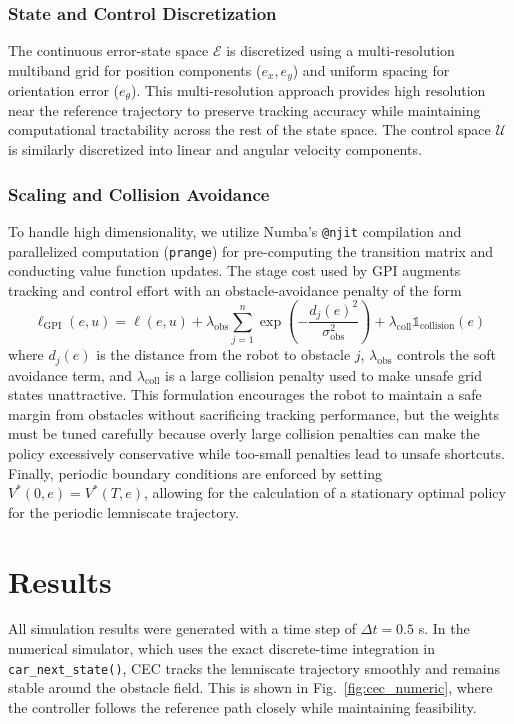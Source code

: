 \documentclass[conference]{IEEEtran}
\begin{document}
\subsubsection{State and Control Discretization}
The continuous error-state space $\mathcal{E}$ is discretized using a multi-resolution multiband grid for position components ($e_x, e_y$) and uniform spacing for orientation error ($e_\theta$). This multi-resolution approach provides high resolution near the reference trajectory to preserve tracking accuracy while maintaining computational tractability across the rest of the state space. The control space $\mathcal{U}$ is similarly discretized into linear and angular velocity components.

\subsubsection{Scaling and Collision Avoidance}
To handle high dimensionality, we utilize Numba's \texttt{@njit} compilation and parallelized computation (\texttt{prange}) for pre-computing the transition matrix and conducting value function updates. The stage cost used by GPI augments tracking and control effort with an obstacle-avoidance penalty of the form
\begin{equation}
    \ell_{\mathrm{GPI}}(e, u) = \ell(e, u) + \lambda_{\mathrm{obs}} \sum_{j=1}^{n} \exp\!\left(-\frac{d_j(e)^2}{\sigma_{\mathrm{obs}}^2}\right) + \lambda_{\mathrm{coll}} \mathds{1}_{\mathrm{collision}}(e)
\end{equation}
where $d_j(e)$ is the distance from the robot to obstacle $j$, $\lambda_{\mathrm{obs}}$ controls the soft avoidance term, and $\lambda_{\mathrm{coll}}$ is a large collision penalty used to make unsafe grid states unattractive. This formulation encourages the robot to maintain a safe margin from obstacles without sacrificing tracking performance, but the weights must be tuned carefully because overly large collision penalties can make the policy excessively conservative while too-small penalties lead to unsafe shortcuts. Finally, periodic boundary conditions are enforced by setting $V^*(0, e) = V^*(T, e)$, allowing for the calculation of a stationary optimal policy for the periodic lemniscate trajectory.

\section{Results}
All simulation results were generated with a time step of $\Delta t = 0.5$ s. In the numerical simulator, which uses the exact discrete-time integration in \texttt{car\_next\_state()}, CEC tracks the lemniscate trajectory smoothly and remains stable around the obstacle field. This is shown in Fig.~\ref{fig:cec_numeric}, where the controller follows the reference path closely while maintaining feasibility.
\end{document}
